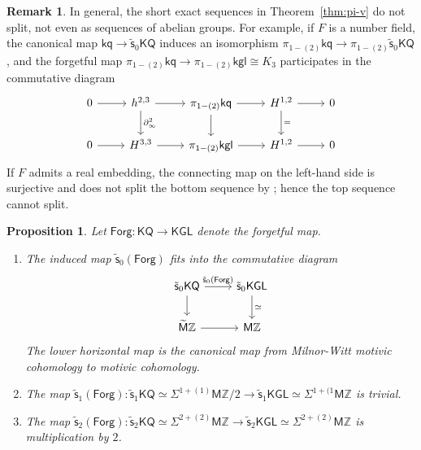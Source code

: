 \documentclass[11pt,hyp,english]{article}
\newcommand{\Z}{\mathbb{Z}}
\newcommand{\KGL}{\mathsf{KGL}}
\newcommand{\kgl}{\mathsf{kgl}}
\newcommand{\KQ}{\mathsf{KQ}}
\newcommand{\kq}{\mathsf{kq}}
\newcommand{\HZ}{\mathsf{M}\Z}
\newcommand{\cHZ}{\wt{{\mathsf{M}}}{\Z}}
\newcommand{\wt}[1]{\widetilde{#1}}
\newcommand{\vs}{\tilde{\mathsf{s}}}
\newcommand{\bideg}{(\star)}
\newcommand{\Forg}{\mathsf{Forg}}
\let\iso=\cong
\newtheorem{proposition}[theorem]{Proposition}
\theoremstyle{definition}
\newtheorem{remark}[theorem]{Remark}
\begin{document}
\begin{remark}
\label{rem:pi-v}
In general, 
the short exact sequences in Theorem~\ref{thm:pi-v} do not split, 
not even as sequences of abelian groups. 
For example, 
if $F$ is a number field, 
the canonical map $\kq\to \vs_{0}\KQ $ induces an isomorphism $\pi_{1-(2)}\kq \to \pi_{1-(2)}\vs_{0}\KQ $, 
and the forgetful map $\pi_{1-(2)}\kq\to \pi_{1-(2)}\kgl\iso K_3$ participates in the commutative diagram
\[
\begin{tikzcd}
0\ar[r] & h^{2,3} \ar[r] \ar[d,"\partial^2_\infty"] & \pi_{1-(2)}\kq \ar[r]\ar[d] & H^{1,2} 
\ar[r] \ar[d,"="] & 0 \\
0\ar[r] & H^{3,3} \ar[r] & \pi_{1-(2)}\kgl \ar[r] & H^{1,2} \ar[r] & 0
\end{tikzcd}\]
If $F$ admits a real embedding, 
the connecting map on the left-hand side is surjective and does not split the bottom sequence by \cite{lee-szczarba}; 
hence the top sequence cannot split. 
\end{remark}

\begin{proposition}
\label{prop:veff-forg}
Let $\Forg:\KQ\to\KGL$ denote the forgetful map.
\begin{enumerate}
\item The induced map $\vs_0(\Forg)$ fits into the commutative diagram
\[\begin{tikzcd}
\vs_0\KQ \ar{r}{\vs_0(\Forg)}\ar{d} & \vs_0\KGL\ar{d}{\simeq}\\
\cHZ\ar{r} & \HZ
\end{tikzcd}\]
The lower horizontal map is the canonical map from Milnor-Witt motivic cohomology to motivic cohomology.
\item The map $\vs_1(\Forg)\colon\vs_1\KQ \simeq\Sigma^{1+(1)}\HZ/2\to\vs_1\KGL\simeq\Sigma^{1+(1}\HZ$ 
is trivial.
\item The map $\vs_2(\Forg)\colon \vs_2\KQ \simeq\Sigma^{2+(2)}\HZ\to \vs_2\KGL\simeq\Sigma^{2+(2)}\HZ$ 
is multiplication by $2$.
\end{enumerate}
\end{proposition}
\end{document}
